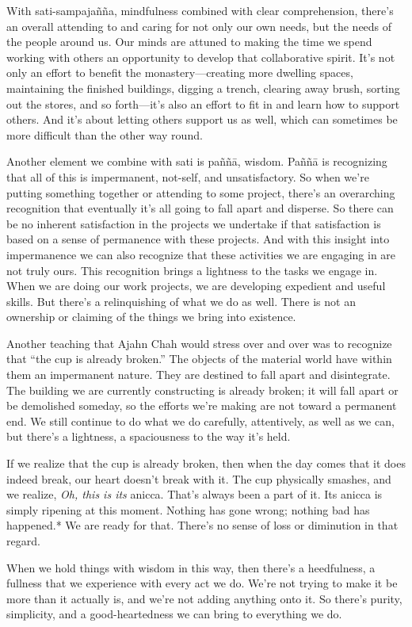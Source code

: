 With sati-sampajañña, mindfulness combined with clear comprehension, 
there's an overall attending to and caring for not only our own needs, 
but the needs of the people around us. Our minds are attuned to making 
the time we spend working with others an opportunity to develop that 
collaborative spirit. It's not only an effort to benefit the 
monastery---creating more dwelling spaces, maintaining the finished 
buildings, digging a trench, clearing away brush, sorting out the 
stores, and so forth---it's also an effort to fit in and learn how to 
support others. And it's about letting others support us as well, which 
can sometimes be more difficult than the other way round.

Another element we combine with sati is paññā, wisdom. Paññā is 
recognizing that all of this is impermanent, not-self, and 
unsatisfactory. So when we're putting something together or attending 
to some project, there's an overarching recognition that eventually 
it's all going to fall apart and disperse. So there can be no inherent 
satisfaction in the projects we undertake if that satisfaction is based 
on a sense of permanence with these projects. And with this insight 
into impermanence we can also recognize that these activities we are 
engaging in are not truly ours. This recognition brings a lightness to 
the tasks we engage in. When we are doing our work projects, we are 
developing expedient and useful skills. But there's a relinquishing of 
what we do as well. There is not an ownership or claiming of the things 
we bring into existence.

Another teaching that Ajahn Chah would stress over and over was to 
recognize that ``the cup is already broken.'' The objects of the 
material world have within them an impermanent nature. They are 
destined to fall apart and disintegrate. The building we are currently 
constructing is already broken; it will fall apart or be demolished 
someday, so the efforts we're making are not toward a permanent end. We 
still continue to do what we do carefully, attentively, as well as we 
can, but there's a lightness, a spaciousness to the way it's held.

If we realize that the cup is already broken, then when the day comes 
that it does indeed break, our heart doesn't break with it. The cup 
physically smashes, and we realize, \emph{Oh, this is its }anicca. 
That's always been a part of it. Its anicca is simply ripening at this 
moment. Nothing has gone wrong; nothing bad has happened.* We are ready 
for that. There's no sense of loss or diminution in that regard.

When we hold things with wisdom in this way, then there's a 
heedfulness, a fullness that we experience with every act we do. We're 
not trying to make it be more than it actually is, and we're not adding 
anything onto it. So there's purity, simplicity, and a good-heartedness 
we can bring to everything we do.


